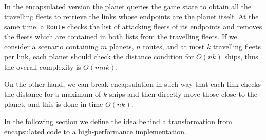 In the encapsulated version the planet queries the game state to obtain all the travelling fleets to retrieve the links whose endpoints are the planet itself. At the same time, a \texttt{Route} checks the list of attacking fleets of its endpoints and removes the fleets which are contained in both lists from the travelling fleets. If we consider a scenario containing $m$ planets, $n$ routes, and at most $k$ travelling fleets per link, each planet should check the distance condition for $O(nk)$ ships, thus the overall complexity is $O(mnk)$.

On the other hand, we can break encapsulation in such way that each link checks the distance for a maximum of $k$ ships and then directly move those close to the planet, and this is done in time $O(nk)$.

\vspace{0.5cm}
\noindent
In the following section we define the idea behind a transformation from encapsulated code to a high-performance implementation. 